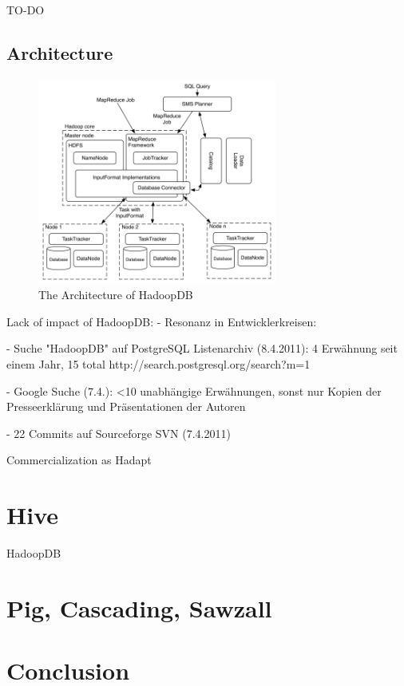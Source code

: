 \documentclass[12pt,a4paper]{scrartcl}		%
\begin{document}
TO-DO
\subsection{Architecture}
\begin{figure}[t]
  \centering
  \includegraphics[width=0.7\textwidth]{images/hadoopdb-arch.png}
  \caption{The Architecture of HadoopDB\cite{journals/pvldb/AbouzeidBARS09}}
  \label{fig:hadoopdbarch}
\end{figure}

Lack of impact of HadoopDB:
  - Resonanz in Entwicklerkreisen:

    - Suche "HadoopDB" auf PostgreSQL Listenarchiv (8.4.2011): 4 Erwähnung seit einem Jahr, 15 total
      http://search.postgresql.org/search?m=1

    - Google Suche (7.4.): <10 unabhängige Erwähnungen, sonst nur Kopien der Presseerklärung und Präsentationen der Autoren

    - 22 Commits auf Sourceforge SVN (7.4.2011)

Commercialization as Hadapt

\section{Hive}
HadoopDB 

\section{Pig, Cascading, Sawzall}

\section{Conclusion}



{}

\end{document}
